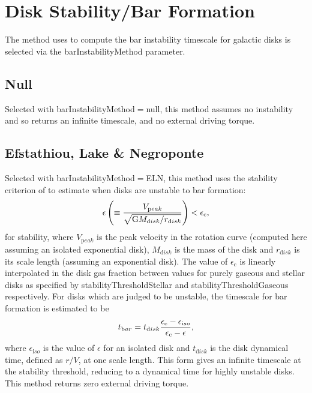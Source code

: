 \section{Disk Stability/Bar Formation}\label{sec:DiskStability}

The method uses to compute the bar instability timescale for galactic disks is selected via the {\normalfont \ttfamily barInstabilityMethod} parameter.

\subsection{Null}

Selected with {\normalfont \ttfamily barInstabilityMethod}$=${\normalfont \ttfamily null}, this method assumes no instability and so returns an infinite timescale, and no external driving torque.

\subsection{Efstathiou, Lake \& Negroponte}

Selected with {\normalfont \ttfamily barInstabilityMethod}$=${\normalfont \ttfamily ELN}, this method uses the stability criterion of \cite{efstathiou_stability_1982} to estimate when disks are unstable to bar formation:
\begin{equation}
 \epsilon \left( \equiv {V_{\mathrm peak} \over \sqrt{\G M_{\mathrm disk}/r_{\mathrm disk}}} \right) < \epsilon_{\mathrm c},
\end{equation}
for stability, where $V_{\mathrm peak}$ is the peak velocity in the rotation curve (computed here assuming an isolated exponential disk), $M_{\mathrm disk}$ is the mass of the disk and $r_{\mathrm disk}$ is its scale length (assuming an exponential disk). The value of $\epsilon_{\mathrm c}$ is linearly interpolated in the disk gas fraction between values for purely gaseous and stellar disks as specified by {\normalfont \ttfamily stabilityThresholdStellar} and {\normalfont \ttfamily stabilityThresholdGaseous} respectively. For disks which are judged to be unstable, the timescale for bar formation is estimated to be
\begin{equation}
 t_{\mathrm bar} = t_{\mathrm disk} {\epsilon_{\mathrm c} - \epsilon_{\mathrm iso} \over \epsilon_{\mathrm c} - \epsilon},
\end{equation}
where $\epsilon_{\mathrm iso}$ is the value of $\epsilon$ for an isolated disk and $t_{\mathrm disk}$ is the disk dynamical time, defined as $r/V$, at one scale length. This form gives an infinite timescale at the stability threshold, reducing to a dynamical time for highly unstable disks. This method returns zero external driving torque.

